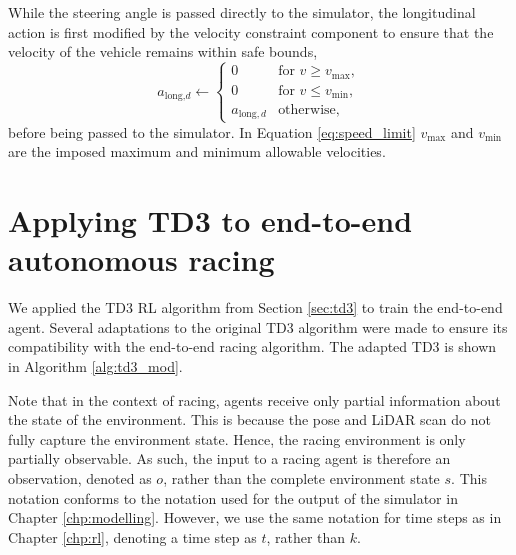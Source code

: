 While the steering angle is passed directly to the simulator, the longitudinal action is first modified by the velocity constraint component to ensure that the velocity of the vehicle remains within safe bounds,
\begin{equation}
    a_{\text{long,}d} \leftarrow 
    \begin{cases}
    0                   &   \text{for } v \geq v_{\text{max}}, \\
    0                   &   \text{for } v \leq v_{\text{min}}, \\
    a_{\text{long},d}   &   \text{otherwise},
    \end{cases}
\label{eq:speed_limit}
\end{equation}
before being passed to the simulator. In Equation \ref{eq:speed_limit} $v_{\text{max}}$ and $v_{\text{min}}$ are the imposed maximum and minimum allowable velocities.




\section{Applying TD3 to end-to-end autonomous racing}\label{sec:td3_end_to_end}

We applied the TD3 RL algorithm from Section \ref{sec:td3} to train the end-to-end agent.
Several adaptations to the original TD3 algorithm were made to ensure its compatibility with the end-to-end racing algorithm.
The adapted TD3 is shown in Algorithm \ref{alg:td3_mod}.



Note that in the context of racing, agents receive only partial information about the state of the environment.
This is because the pose and LiDAR scan do not fully capture the environment state.
Hence, the racing environment is only partially observable.
As such, the input to a racing agent is therefore an observation, denoted as $o$, rather than the complete environment state $s$.
This notation conforms to the notation used for the output of the simulator in Chapter \ref{chp:modelling}.
However, we use the same notation for time steps as in Chapter \ref{chp:rl}, denoting a time step as $t$, rather than $k$.



